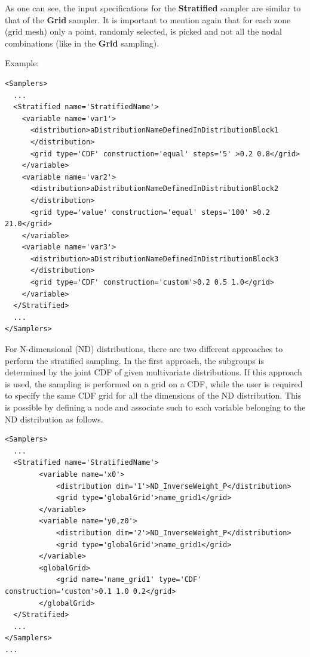 As one can see, the input specifications for the \textbf{Stratified} sampler are
similar to that of the \textbf{Grid} sampler.
%
It is important to mention again that for each zone (grid mesh) only a point,
randomly selected, is picked and not all the nodal combinations (like in the
\textbf{Grid} sampling).


Example:
\begin{lstlisting}[style=XML,morekeywords={construction,steps,lowerBound,upperBound}]
<Samplers>
  ...
  <Stratified name='StratifiedName'>
    <variable name='var1'>
      <distribution>aDistributionNameDefinedInDistributionBlock1
      </distribution>
      <grid type='CDF' construction='equal' steps='5' >0.2 0.8</grid>
    </variable>
    <variable name='var2'>
      <distribution>aDistributionNameDefinedInDistributionBlock2
      </distribution>
      <grid type='value' construction='equal' steps='100' >0.2 21.0</grid>
    </variable>
    <variable name='var3'>
      <distribution>aDistributionNameDefinedInDistributionBlock3
      </distribution>
      <grid type='CDF' construction='custom'>0.2 0.5 1.0</grid>
    </variable>
  </Stratified>
  ...
</Samplers>
\end{lstlisting}

For N-dimensional  (ND) distributions, there are two different approaches to perform the stratified sampling. In the first approach,
the subgroups is determined by the joint CDF of given multivariate distributions. If this approach is used, the sampling is performed
on a grid on a CDF, while the user is required to specify the same CDF grid for all the dimensions of the ND distribution.
This is possible by defining a  node and associate such  to each variable belonging to the
ND distribution as follows.

\begin{lstlisting}[style=XML,morekeywords={ND,grid}]
<Samplers>
  ...
  <Stratified name='StratifiedName'>
        <variable name='x0'>
            <distribution dim='1'>ND_InverseWeight_P</distribution>
            <grid type='globalGrid'>name_grid1</grid>
        </variable>
        <variable name='y0,z0'>
            <distribution dim='2'>ND_InverseWeight_P</distribution>
            <grid type='globalGrid'>name_grid1</grid>
        </variable>
        <globalGrid>
            <grid name='name_grid1' type='CDF' construction='custom'>0.1 1.0 0.2</grid>
        </globalGrid>
  </Stratified>
  ...
</Samplers>
...
\end{lstlisting}

